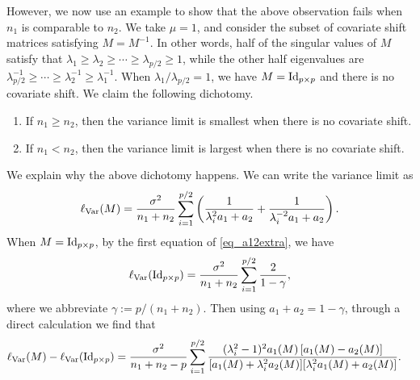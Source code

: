 \begin{example}
However, we now use an example to show that the above observation fails when $n_1$ is comparable to $n_2$. We take $\mu =1$, and consider the subset of covariate shift matrices satisfying $M=M^{-1}$. In other words, half of the singular values of $M$ satisfy that $\lambda_1 \ge \lambda_2\ge \cdots \ge \lambda_{p/2} \ge 1$, while the other half eigenvalues are $\lambda_{p/2}^{-1}\ge \cdots \ge \lambda_2^{-1} \ge \lambda_1^{-1}$. When $\lambda_1/\lambda_{p/2} = 1$, we have $M=\operatorname{Id}_{p\times p}$ and there is no covariate shift.
We claim the following dichotomy.
\begin{enumerate}
	\item If $n_1 \ge n_2$, then the variance limit is smallest when there is no covariate shift.
	\item If $n_1 < n_2$, then the variance limit is largest when there is no covariate shift.
\end{enumerate}
We explain why the above dichotomy happens. We can write the variance limit as
$$\ell_{\operatorname{Var}}(M)=\frac{\sigma^2}{ n_1+n_2 }\sum_{i=1}^{p/2}\left( \frac{1}{\lambda_i^{2} a_1 + a_2} + \frac1{\lambda_i^{-2} a_1 + a_2} \right) .$$
When $M=\operatorname{Id}_{p\times p}$, by the first equation of \eqref{eq_a12extra}, we have
$$\ell_{\operatorname{Var}}(\operatorname{Id}_{p\times p})=\frac{\sigma^2}{ n_1+n_2 }\sum_{i=1}^{p/2} \frac{2}{1-\gamma} , $$
where we abbreviate $\gamma:=p/(n_1+n_2)$. Then using $a_1+a_2=1-\gamma$, through a direct calculation we find that %
\begin{align*}
\ell_{\var}(M) - \ell_{\var}(\id_{p\times p})%
&= \frac{\sigma^2 }{ n_1+n_2-p} \sum_{i=1}^{p/2} \frac{(\lambda_i^2-1)^2 a_1(M) \left[ a_1(M) - a_2(M)\right] }{[a_1(M)+\lambda_i^2 a_2(M)][\lambda_i^2 a_1(M)+a_2(M)]} .
\end{align*}

\end{example}
